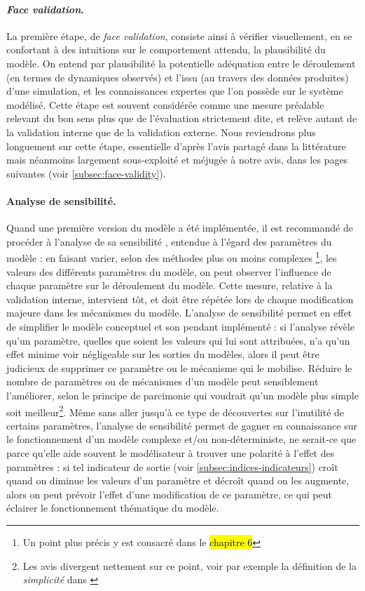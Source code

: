 \paragraph{\og \textit{Face validation}\fg{}.}
La première étape, de \og \textit{face validation}\fg{}, consiste ainsi à vérifier visuellement, en se confortant à des intuitions sur le comportement attendu, la plausibilité du modèle.
On entend par plausibilité la potentielle adéquation entre le déroulement (en termes de dynamiques observés) et l'issu (au travers des données produites) d'une simulation, et les connaissances expertes que l'on possède sur le système modélisé.
Cette étape est souvent considérée comme une mesure préalable relevant du bon sens plus que de l'évaluation strictement dite, et relève autant de la validation interne que de la validation externe.
Nous reviendrons plus longuement sur cette étape, essentielle d'après l'avis partagé dans la littérature mais néanmoins largement sous-exploité et méjugée à notre avis, dans les pages suivantes (voir \cref{subsec:face-validity}).

\paragraph{Analyse de sensibilité.}
Quand une première version du modèle a été implémentée, il est recommandé de procéder à l'analyse de sa \og sensibilité \fg{}, entendue à l'égard des paramètres du modèle : en faisant varier, selon des méthodes plus ou moins complexes
\footnote{
	Un point plus précis y est consacré dans le \hl{chapitre 6}
}, les valeurs des différents paramètres du modèle, on peut observer l'influence de chaque paramètre sur le déroulement du modèle.
Cette mesure, relative à la validation interne, intervient tôt, et doit être répétée lors de chaque modification majeure dans les mécanismes du modèle.
L'analyse de sensibilité permet en effet de simplifier le modèle conceptuel et son pendant implémenté :
	si l'analyse révèle qu'un paramètre, quelles que soient les valeurs qui lui sont attribuées, n'a qu'un effet minime voir négligeable sur les sorties du modèles, alors il peut être judicieux de supprimer ce paramètre ou le mécanisme qui le mobilise.
Réduire le nombre de paramètres ou de mécanismes d'un modèle peut sensiblement l'améliorer, selon le principe de parcimonie qui voudrait qu'un modèle plus simple soit meilleur\footnote{
	Les avis divergent nettement sur ce point, voir par exemple la définition de la \textit{simplicité} dans \textcite[120]{amblard_evaluation_2006}
}.
Même sans aller jusqu'à ce type de découvertes sur l'inutilité de certains paramètres, l'analyse de sensibilité permet de gagner en connaissance sur le fonctionnement d'un modèle complexe et/ou non-déterministe, ne serait-ce que parce qu'elle aide souvent le modélisateur à trouver une \og polarité \fg{} à l'effet des paramètres :
	si tel indicateur de sortie (voir \cref{subsec:indices-indicateurs}) croît quand on diminue les valeurs d'un paramètre et décroît quand on les augmente, alors on peut prévoir l'effet d'une modification de ce paramètre, ce qui peut éclairer le fonctionnement thématique du modèle.

